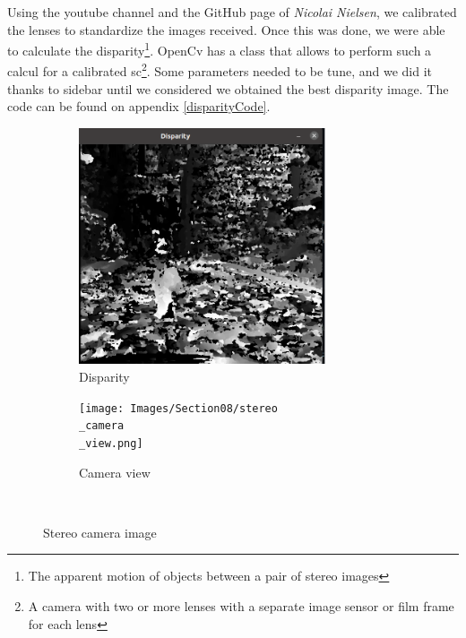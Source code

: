 \bigbreak
Using the youtube channel and the GitHub page of \textit{Nicolai Nielsen}, we calibrated the lenses to standardize the images received. Once this was done, we were able to calculate the \gls{disparity}\footnote{The apparent motion of objects between a pair of stereo images}. OpenCv has a class that allows to perform such a calcul for a calibrated \gls{sc}\footnote{A camera with two or more lenses with a separate image sensor or film frame for each lens}. Some parameters needed to be tune, and we did it thanks to sidebar until we considered we obtained the best disparity image. The code can be found on appendix \ref{disparityCode}.
\begin{figure}[H]
    \begin{subfigure}{.5\linewidth}
        \centering
        \includegraphics[width=0.8\textwidth]{Images/Section08/disparity.png}
        \caption{Disparity}
        \label{fig:disparity}
    \end{subfigure}%
    \begin{subfigure}{.5\linewidth}
        \centering
        \texttt{[image: Images/Section08/stereo\\\_camera\\\_view.png]}
        \caption{Camera view}
        \label{fig:Stereoview}
    \end{subfigure}\\[1ex]
    \caption{Stereo camera image}
    \label{fig:Sci}
\end{figure}
\FloatBarrier

